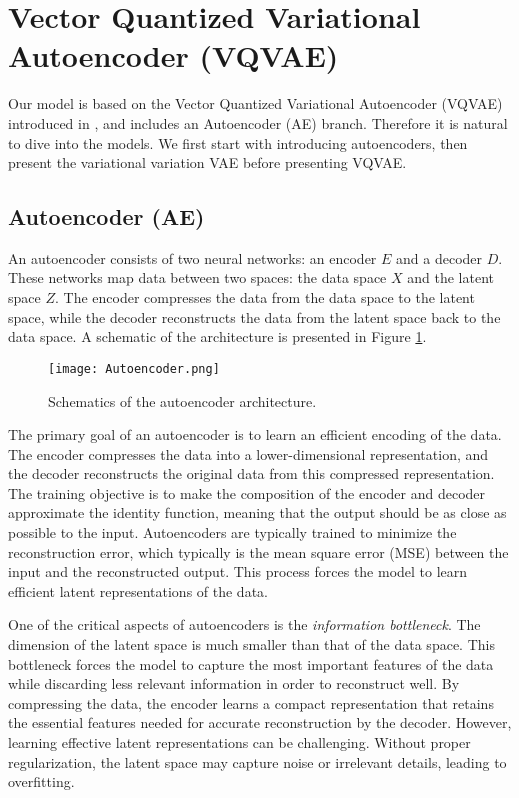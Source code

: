 \documentclass[../../thesis.tex]{subfiles}
\begin{document}
\section{Vector Quantized Variational Autoencoder (VQVAE)}
\label{section:VQVAE}
Our model is based on the Vector Quantized Variational Autoencoder (VQVAE) introduced in \cite{VQVAE}, and includes an Autoencoder (AE) branch. Therefore it is natural to dive into the models. We first start with introducing autoencoders, then present the variational variation VAE before presenting VQVAE. 

\subsection{Autoencoder (AE)}

An autoencoder consists of two neural networks: an encoder $E$ and a decoder $D$. These networks map data between two spaces: the data space $X$ and the latent space $Z$. The encoder compresses the data from the data space to the latent space, while the decoder reconstructs the data from the latent space back to the data space. A schematic of the architecture is presented in Figure \ref{fig:autoencoder}. \newline

\begin{figure}[h]
    \texttt{[image: Autoencoder.png]}
    \centering
    \caption{Schematics of the autoencoder architecture.}
    \label{fig:autoencoder}
\end{figure}

The primary goal of an autoencoder is to learn an efficient encoding of the data. The encoder compresses the data into a lower-dimensional representation, and the decoder reconstructs the original data from this compressed representation. The training objective is to make the composition of the encoder and decoder approximate the identity function, meaning that the output should be as close as possible to the input. Autoencoders are typically trained to minimize the reconstruction error, which typically is the mean square error (MSE) between the input and the reconstructed output. This process forces the model to learn efficient latent representations of the data.\newline

One of the critical aspects of autoencoders is the \textit{information bottleneck}. The dimension of the latent space is much smaller than that of the data space. This bottleneck forces the model to capture the most important features of the data while discarding less relevant information in order to reconstruct well. By compressing the data, the encoder learns a compact representation that retains the essential features needed for accurate reconstruction by the decoder. However, learning effective latent representations can be challenging. Without proper regularization, the latent space may capture noise or irrelevant details, leading to overfitting.\newline
\end{document}
